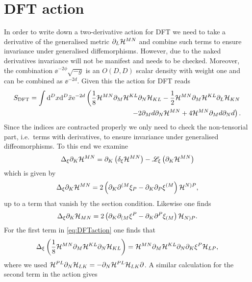 \section{DFT action}
In order to write down a two-derivative action for DFT we need to take a derivative of the generalised metric $\partial_L\mathcal{H}^{MN}$ and combine such terms to ensure invariance under generalised diffemorphisms. However, due to the naked derivatives invariance will not be manifest and needs to be checked. Moreover, the combination $\ee^{-2\phi}\sqrt{-g}$ is an $O(D,D)$ scalar density with weight one and can be combined as $\ee^{-2d}$. Given this the action for DFT reads
\begin{equation}
\begin{aligned}\label{eq:DFTaction}
    S_{\text{DFT}} = \int \mathrm{d}^Dx\mathrm{d}^D\tilde{x} \mathrm{e}^{-2d}\left(\frac{1}{8}\mathcal{H}^{MN}\partial_M\mathcal{H}^{KL}\partial_N\mathcal{H}_{KL}-\frac{1}{2}\mathcal{H}^{MN}\partial_M\mathcal{H}^{KL}\partial_L\mathcal{H}_{KN}\right.\\
    \left. -2\partial_M d\partial_N\mathcal{H}^{MN}+4\mathcal{H}^{MN}\partial_M d\partial_N d\right).
\end{aligned}
\end{equation}
Since the indices are contracted properly we only need to check the non-tensorial part, i.e.\ terms with derivatives, to ensure invariance under generalised diffeomorphisms. To this end we examine
\begin{equation}
    \Delta_\xi \partial_K \mathcal{H}^{MN} = \partial_K\left(\delta_\xi\mathcal{H}^{MN}\right)-\mathscr{L}_\xi\left(\partial_K\mathcal{H}^{MN}\right)
\end{equation}
which is given by 
\begin{equation}
    \Delta_\xi \partial_K \mathcal{H}^{MN} = 2\left(\partial_K\partial^{(M}\xi_P-\partial_K\partial_P\xi^{(M}\right)\mathcal{H}^{N)P},
\end{equation}
up to a term that vanish by the section condition. Likewise one finds 
\begin{equation}
    \Delta_\xi \partial_K\mathcal{H}_{MN} = 2\left(\partial_K\partial_{(M}\xi^P-\partial_K\partial^P\xi_{(M}\right)\mathcal{H}_{N)P}.
\end{equation}
For the first term in \eqref{eq:DFTaction} one finds that 
\begin{equation}\label{eq:dftvar1}
    \Delta_\xi\left(\frac{1}{8}\mathcal{H}^{MN}\partial_M\mathcal{H}^{KL}\partial_N\mathcal{H}_{KL}\right) = \mathcal{H}^{MN}\partial_M\mathcal{H}^{KL}\partial_N\partial_K\xi^P\mathcal{H}_{LP},
\end{equation}
where we used $\mathcal{H}^{PL}\partial_N\mathcal{H}_{LK}=-\partial_N\mathcal{H}^{PL}\mathcal{H}_{LK}\partial$. A similar calculation for the second term in the action gives 
